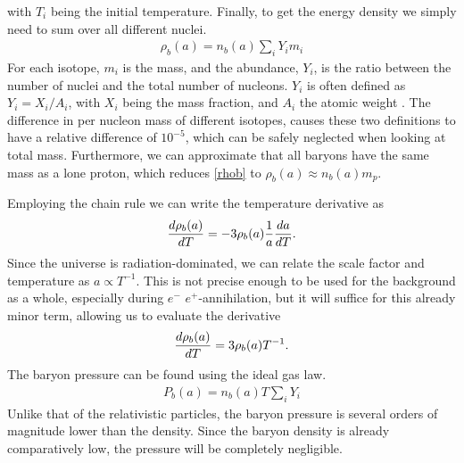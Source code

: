 with $T_i$ being the initial temperature. Finally, to get the energy density we simply need to sum over all different nuclei. 
\begin{align}
    \rho_b(a)=n_b(a)\sum_{i}^{}Y_i m_i
    \label{rhob}
\end{align}
For each isotope, $m_i$ is the mass, and the abundance, $Y_i$, is the ratio between the number of nuclei and the total number of nucleons. $Y_i$ is often defined as $Y_i=X_i/A_i$, with $X_i$ being the mass fraction, and $A_i$ the atomic weight \cite{Wagoner69}. The difference in per nucleon mass of different isotopes, causes these two definitions to have a relative difference of $10^{-5}$, which can be safely neglected when looking at total mass. Furthermore, we can approximate that all baryons have the same mass as a lone proton, which reduces \eqref{rhob} to $\rho_b(a) \approx n_b(a)m_p$. 

Employing the chain rule we can write the temperature derivative as 
\begin{align}
    \frac{d\rho_b(a)}{dT} = -3\rho_b(a)\frac{1}{a}\frac{da}{dT}.
\end{align}
Since the universe is radiation-dominated, we can relate the scale factor and temperature as $a\propto T^{-1}$. This is not precise enough to be used for the background as a whole, especially during $e^-$ $e^+$-annihilation, but it will suffice for this already minor term, allowing us to evaluate the derivative
\begin{align}
    \frac{d\rho_b(a)}{dT} = 3\rho_b(a)T^{-1}.
    \label{drhob}
\end{align}
The baryon pressure can be found using the ideal gas law.
\begin{align}
    P_b(a)= n_b(a)T\sum_{i}^{}Y_i
\end{align}
Unlike that of the relativistic particles, the baryon pressure is several orders of magnitude lower than the density. Since the baryon density is already comparatively low, the pressure will be completely negligible.





